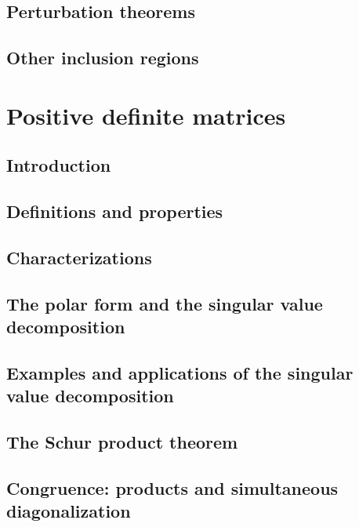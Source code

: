 \documentclass[a4paper]{article}
\newcommand{\todobox}{\textcolor{red}{\fbox{\phantom{--}}}}
\begin{document}
\subsection{Perturbation theorems}
\todobox
\subsection{Other inclusion regions}
\todobox
\newpage
\section{Positive definite matrices}
\setcounter{subsection}{-1}
\subsection{Introduction}
\todobox
\subsection{Definitions and properties}
\todobox
\subsection{Characterizations}
\todobox
\subsection{The polar form and the singular value decomposition}
\todobox
\subsection{Examples and applications of the singular value decomposition}
\todobox
\subsection{The Schur product theorem}
\todobox
\subsection{Congruence: products and simultaneous diagonalization}
\todobox
\end{document}
